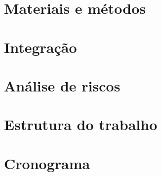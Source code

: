 \section{\textbf{Materiais e métodos}}


\section{\textbf{Integração}}


\section{\textbf{Análise de riscos}}


\section{\textbf{Estrutura do trabalho}}


\section{\textbf{Cronograma}}